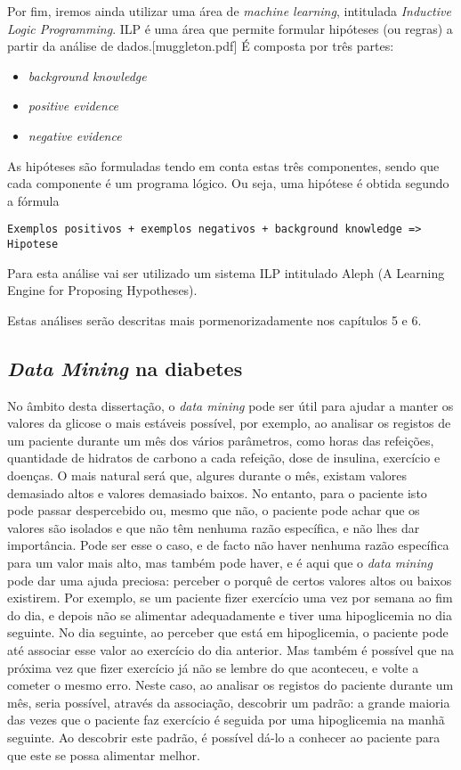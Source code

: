 Por fim, iremos ainda utilizar uma área de \textit{machine learning}, intitulada \textit{Inductive Logic Programming}. ILP é uma área que permite formular hipóteses (ou regras) a partir da análise de dados.[muggleton.pdf] É composta por três partes:
\begin{itemize}
\item \textit{background knowledge}
\item \textit{positive evidence}
\item \textit{negative evidence}
\end{itemize}

As hipóteses são formuladas tendo em conta estas três componentes, sendo que cada componente é um programa lógico. Ou seja, uma hipótese é obtida segundo a fórmula

\begin{lstlisting}
Exemplos positivos + exemplos negativos + background knowledge => Hipotese
\end{lstlisting}
Para esta análise vai ser utilizado um sistema ILP intitulado Aleph (A Learning Engine for Proposing Hypotheses).

Estas análises serão descritas mais pormenorizadamente nos capítulos 5 e 6.

\subsection{\textit{Data Mining} na diabetes}

No âmbito desta dissertação, o \textit{data mining} pode ser útil para ajudar a manter os valores da glicose o mais estáveis possível, por exemplo, ao analisar os registos de um paciente durante um mês dos vários parâmetros, como horas das refeições, quantidade de hidratos de carbono a cada refeição, dose de insulina, exercício e doenças. O mais natural será que, algures durante o mês, existam valores demasiado altos e valores demasiado baixos. 
No entanto, para o paciente isto pode passar despercebido ou, mesmo que não, o paciente pode achar que os valores são isolados e que não têm nenhuma razão específica, e não lhes dar importância. Pode ser esse o caso, e de facto não haver nenhuma razão específica para um valor mais alto, mas também pode haver, e é aqui que o \textit{data mining} pode dar uma ajuda preciosa:  perceber o porquê de certos valores altos ou baixos existirem. Por exemplo, se um paciente fizer exercício uma vez por semana ao fim do dia, e depois não se alimentar adequadamente e tiver uma hipoglicemia no dia seguinte. No dia seguinte, ao perceber que está em hipoglicemia, o paciente pode até associar esse valor ao exercício do dia anterior. Mas também é possível que na próxima vez que fizer exercício já não se lembre do que aconteceu, e volte a cometer o mesmo erro. 
Neste caso, ao analisar os registos do paciente durante um mês, seria possível, através da associação, descobrir um padrão: a grande maioria das vezes que o paciente faz exercício é seguida por uma hipoglicemia na manhã seguinte. Ao descobrir este padrão, é possível dá-lo a conhecer ao paciente para que este se possa alimentar melhor.

